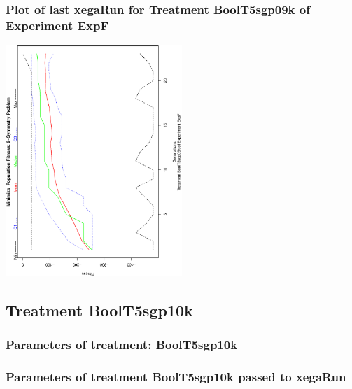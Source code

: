 \documentclass[18pt,c]{beamer}
\makeatletter
\def\beamer@writeslidentry@miniframesoff{%
  \expandafter\beamer@ifempty\expandafter{\beamer@framestartpage}{}%
  {%
   \clearpage\beamer@notesactions%
  }
}
\newcommand*{\miniframesoff}{\let\beamer@writeslidentry=\beamer@writeslidentry@miniframesoff}
\makeatother
\begin{document}
 \begin{frame}
 \frametitle{ Plot of last xegaRun for Treatment BoolT5sgp09k of Experiment ExpF }
 \begin{center}
\includegraphics[width=0.5\textwidth, angle=-90]
{ExpFPlotPopStatsFigure007.eps}
 \end{center}
 \label{report/ExpFPlotPopStatsFigure007.eps}  
 \end{frame}

\miniframesoff
\subsection{Treatment BoolT5sgp10k}

 \begin{frame}
 \fontsize{8pt}{9pt}\selectfont
 \frametitle{  Parameters of treatment: BoolT5sgp10k 
 }

 \label{ExpFtParmTable032.tex}  
 \end{frame}


 \begin{frame}
 \fontsize{8pt}{9pt}\selectfont
 \frametitle{  Parameters of treatment BoolT5sgp10k passed to xegaRun
 }

 \label{ExpFtParmTable033.tex}  
 \end{frame}
\end{document}
